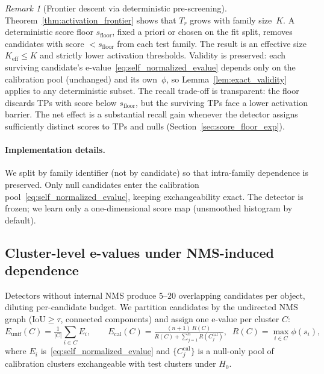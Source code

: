\documentclass{article}
\theoremstyle{remark}
\newtheorem{remark}{Remark}
\newcommand{\IoU}{\mathrm{IoU}}
\newcommand{\1}{\mathbf{1}}
\begin{document}
\begin{remark}[Frontier descent via deterministic pre-screening]
\label{rem:score_floor}
Theorem~\ref{thm:activation_frontier} shows that $T_r$ grows with
family size~$K$. A deterministic score floor $s_{\mathrm{floor}}$,
fixed a priori or chosen on the fit split, removes candidates with
score $<s_{\mathrm{floor}}$ from each test family. The result is an
effective size $K_{\mathrm{eff}}\le K$ and strictly lower activation
thresholds. Validity is preserved: each
surviving candidate's e-value~\eqref{eq:self_normalized_evalue} depends
only on the calibration pool (unchanged) and its own~$\phi$, so
Lemma~\ref{lem:exact_validity} applies to any deterministic subset.
The recall trade-off is transparent: the floor discards TPs with
score below $s_{\mathrm{floor}}$, but the surviving TPs face a lower
activation barrier. The net effect is a substantial recall gain
whenever the detector assigns sufficiently distinct scores to TPs
and nulls (Section~\ref{sec:score_floor_exp}).
\end{remark}

\paragraph{Implementation details.}
We split by family identifier (not by candidate) so that intra-family
dependence is preserved. Only null candidates enter the calibration
pool~\eqref{eq:self_normalized_evalue}, keeping exchangeability exact.
The detector is frozen; we learn only a one-dimensional score map
(unsmoothed histogram by default).

\subsection{Cluster-level e-values under NMS-induced dependence}
\label{sec:nms_aware}

Detectors without internal NMS produce $5$--$20$ overlapping candidates
per object, diluting per-candidate budget. We partition candidates by
the undirected NMS graph ($\IoU\ge\tau$, connected components) and
assign one e-value per cluster $C$:
\begin{equation}
\label{eq:cluster_evalues}
E_{\mathrm{unif}}(C) = \tfrac{1}{|C|}\!\sum_{i\in C}\! E_i,
\qquad
E_{\mathrm{cal}}(C) = \tfrac{(n+1)\,R(C)}{R(C)+\sum_{j=1}^{n} R(C^{\mathrm{cal}}_j)},
\;\; R(C)=\max_{i\in C}\phi(s_i),
\end{equation}
where $E_i$ is~\eqref{eq:self_normalized_evalue} and
$\{C^{\mathrm{cal}}_j\}$ is a null-only pool of calibration clusters
exchangeable with test clusters under $H_0$.
\end{document}
